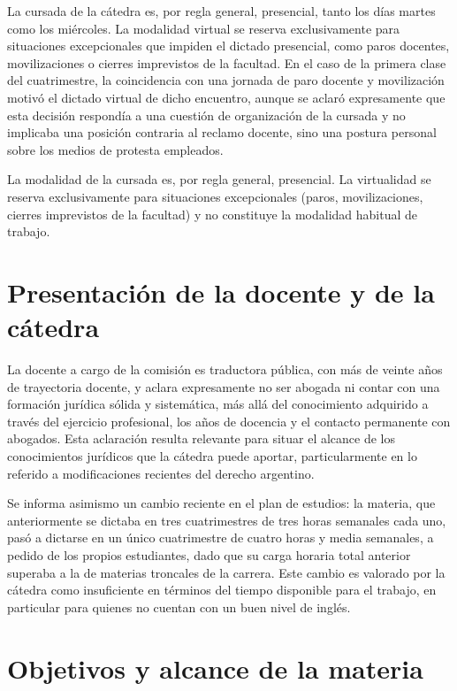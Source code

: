\documentclass[12pt,oneside]{book}
\begin{document}
La cursada de la cátedra es, por regla general, presencial, tanto los días martes como los miércoles. La modalidad virtual se reserva exclusivamente para situaciones excepcionales que impiden el dictado presencial, como paros docentes, movilizaciones o cierres imprevistos de la facultad. En el caso de la primera clase del cuatrimestre, la coincidencia con una jornada de paro docente y movilización motivó el dictado virtual de dicho encuentro, aunque se aclaró expresamente que esta decisión respondía a una cuestión de organización de la cursada y no implicaba una posición contraria al reclamo docente, sino una postura personal sobre los medios de protesta empleados.

\begin{important}
La modalidad de la cursada es, por regla general, presencial. La virtualidad se reserva exclusivamente para situaciones excepcionales (paros, movilizaciones, cierres imprevistos de la facultad) y no constituye la modalidad habitual de trabajo.
\end{important}

\section{Presentación de la docente y de la cátedra}

La docente a cargo de la comisión es traductora pública, con más de veinte años de trayectoria docente, y aclara expresamente no ser abogada ni contar con una formación jurídica sólida y sistemática, más allá del conocimiento adquirido a través del ejercicio profesional, los años de docencia y el contacto permanente con abogados. Esta aclaración resulta relevante para situar el alcance de los conocimientos jurídicos que la cátedra puede aportar, particularmente en lo referido a modificaciones recientes del derecho argentino.

Se informa asimismo un cambio reciente en el plan de estudios: la materia, que anteriormente se dictaba en tres cuatrimestres de tres horas semanales cada uno, pasó a dictarse en un único cuatrimestre de cuatro horas y media semanales, a pedido de los propios estudiantes, dado que su carga horaria total anterior superaba a la de materias troncales de la carrera. Este cambio es valorado por la cátedra como insuficiente en términos del tiempo disponible para el trabajo, en particular para quienes no cuentan con un buen nivel de inglés.

\section{Objetivos y alcance de la materia}
\end{document}
